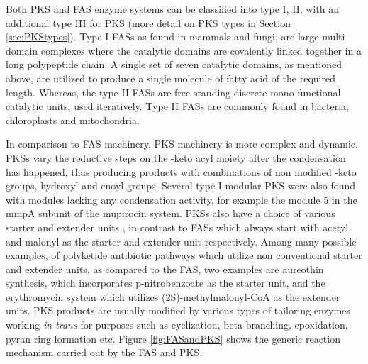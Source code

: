 		Both PKS and FAS enzyme systems can be classified into type I, II, with an additional type III for PKS (more detail on PKS types in Section \ref{sec:PKStypes}). Type I FASs as found in mammals and fungi, are large multi domain complexes where the catalytic domains are covalently linked together in a long polypeptide chain. A single set of seven catalytic domains, as mentioned above, are utilized to produce a single molecule of fatty acid of the required length. Whereas, the type II FASs are free standing discrete mono functional catalytic units, used iteratively. Type II FASs are commonly found in bacteria, chloroplasts and mitochondria.
					
		In comparison to FAS machinery, PKS machinery is more complex and dynamic. PKSs vary the reductive steps on the \bet-keto acyl moiety after the condensation has happened, thus producing products with combinations of non modified \bet-keto groups, hydroxyl and enoyl groups. Several type I modular PKS were also found with modules lacking any condensation activity, for example the module 5 in the mmpA subunit of the mupirocin system. PKSs also have a choice of various starter and extender units \parencite{Khosla1999, Staunton2001}, in contrast to FASs which always start with acetyl and malonyl as the starter and extender unit respectively. Among many possible examples, of polyketide antibiotic pathways which utilize non conventional starter and extender units, as compared to the FAS, two examples are aureothin synthesis, which incorporates p-nitrobenzoate as the starter unit, and the erythromycin system which utilizes (2S)-methylmalonyl-CoA as the extender units.  PKS products are usually modified by various types of tailoring enzymes working \textit{in trans} for purposes such as cyclization, beta branching, epoxidation, pyran ring formation etc. Figure \ref{fig:FASandPKS} shows the generic reaction mechanism carried out by the FAS and PKS.
		
